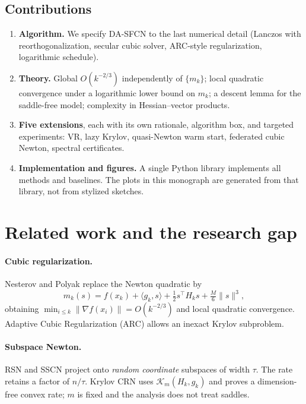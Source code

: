 \documentclass[11pt,a4paper]{article}
\theoremstyle{definition}
\begin{document}
\subsection{Contributions}
\begin{enumerate}[leftmargin=1.4em]
\item \textbf{Algorithm.} We specify DA-SFCN to the last numerical detail
(Lanczos with reorthogonalization, secular cubic solver, ARC-style
regularization, logarithmic schedule).
\item \textbf{Theory.} Global $O(k^{-2/3})$ independently of $\{m_k\}$;
local quadratic convergence under a logarithmic lower bound on $m_k$;
a descent lemma for the saddle-free model; complexity in Hessian--vector
products.
\item \textbf{Five extensions}, each with its own rationale, algorithm box,
and targeted experiments: VR, lazy Krylov, quasi-Newton warm start,
federated cubic Newton, spectral certificates.
\item \textbf{Implementation and figures.} A single Python library
implements all methods and baselines. The plots in this monograph are
generated from that library, not from stylized sketches.
\end{enumerate}

\section{Related work and the research gap}
\paragraph{Cubic regularization.}
Nesterov and Polyak \cite{nesterov2006} replace the Newton quadratic by
\[
m_k(s)=f(x_k)+\langle g_k,s\rangle+\tfrac12 s^\top H_k s+\tfrac{M}{6}\|s\|^3,
\]
obtaining $\min_{i\le k}\|\nabla f(x_i)\|=O(k^{-2/3})$ and local quadratic
convergence. Adaptive Cubic Regularization (ARC) \cite{cartis2011} allows
an inexact Krylov subproblem.

\paragraph{Subspace Newton.}
RSN \cite{gower2019} and SSCN \cite{hanzely2020,zhao2025} project onto
\emph{random coordinate} subspaces of width $\tau$. The rate retains a
factor of $n/\tau$. Krylov CRN \cite{jiang2024} uses
$\mathcal{K}_m(H_k,g_k)$ and proves a dimension-free convex rate; $m$ is
fixed and the analysis does not treat saddles.
\end{document}
